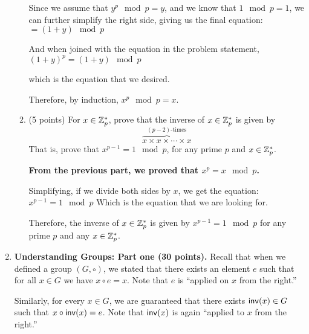 \documentclass[11pt]{article}
\begin{document}
\begin{enumerate}
\begin{enumerate}
{      Since we assume that $y^p\mod p = y$, and we know that $1\mod p = 1$, we can further simplify the right side, giving us the final equation: \newline
      $=(1+y)\mod p$

      And when joined with the equation in the problem statement, \newline
      $(1+y)^p = (1+y)\mod p$

      which is the equation that we desired. \newline

      Therefore, by induction, $x^p\mod p = x$.
  }
   \newpage
   \item(5 points) For $x\in{\mathbb Z}_p^*$, prove that the inverse of $x\in{\mathbb Z}_p^*$ is given by 
     $$\overbrace{x\times x \times \dotsi \times x}^{(p-2)\text{-times}}$$ 
  That is, prove that $x^{p-1}=1\mod p$, for any prime $p$ and $x\in{\mathbb Z}_p^*$.      
     \newline
  {\bfseries
      \newline
      \newline
      From the previous part, we proved that $x^p= x\mod p$.

      Simplifying, if we divide both sides by $x$, we get the equation: \newline
      $x^{p-1}=1\mod p$ \newline
      Which is the equation that we are looking for. \newline

      Therefore, the inverse of $x\in {\mathbb Z}_p^*$ is given by $x^{p-1} = 1\mod p$ for any prime $p$ and any $x\in {\mathbb Z}_p^*$.
  }
   \newpage
  \end{enumerate} 
  

  


  

 
 \item    {\bfseries Understanding Groups: Part one (30 points).} 
    Recall that when we defined a group $(G,\circ)$, we stated that there exists an element $e$ such that for all $x\in G$ we have $x\circ e=x$. 
  Note that $e$ is ``applied on $x$ from the right.'' 
  
  Similarly, for every $x\in G$, we are guaranteed that there exists $\mathsf{inv}(x)\in G$ such that $x\circ\mathsf{inv}(x)=e$. 
  Note that $\mathsf{inv}(x)$ is again ``applied to $x$ from the right.'' 
  

\end{enumerate}
\end{document}

